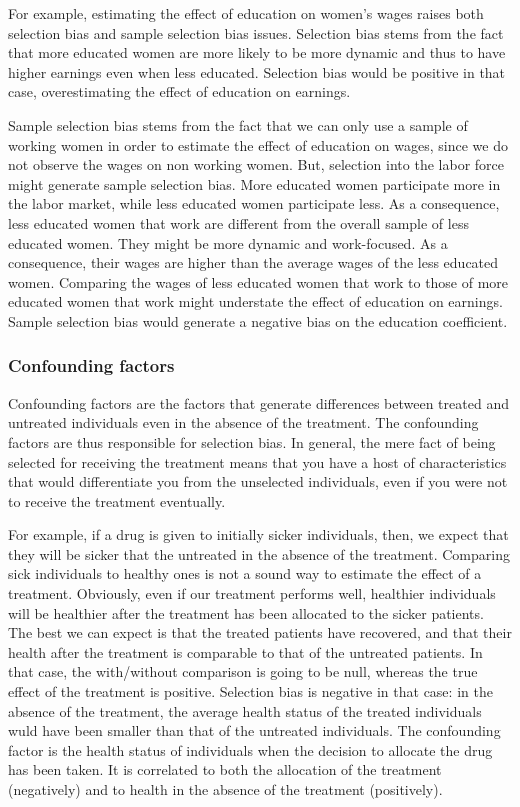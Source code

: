 \documentclass[]{book}
\theoremstyle{definition}
\theoremstyle{definition}
\theoremstyle{definition}
\theoremstyle{remark}
\begin{document}
For example, estimating the effect of education on women's wages raises
both selection bias and sample selection bias issues. Selection bias
stems from the fact that more educated women are more likely to be more
dynamic and thus to have higher earnings even when less educated.
Selection bias would be positive in that case, overestimating the effect
of education on earnings.

Sample selection bias stems from the fact that we can only use a sample
of working women in order to estimate the effect of education on wages,
since we do not observe the wages on non working women. But, selection
into the labor force might generate sample selection bias. More educated
women participate more in the labor market, while less educated women
participate less. As a consequence, less educated women that work are
different from the overall sample of less educated women. They might be
more dynamic and work-focused. As a consequence, their wages are higher
than the average wages of the less educated women. Comparing the wages
of less educated women that work to those of more educated women that
work might understate the effect of education on earnings. Sample
selection bias would generate a negative bias on the education
coefficient.

\subsubsection{Confounding factors}\label{confounding-factors}

Confounding factors are the factors that generate differences between
treated and untreated individuals even in the absence of the treatment.
The confounding factors are thus responsible for selection bias. In
general, the mere fact of being selected for receiving the treatment
means that you have a host of characteristics that would differentiate
you from the unselected individuals, even if you were not to receive the
treatment eventually.

For example, if a drug is given to initially sicker individuals, then,
we expect that they will be sicker that the untreated in the absence of
the treatment. Comparing sick individuals to healthy ones is not a sound
way to estimate the effect of a treatment. Obviously, even if our
treatment performs well, healthier individuals will be healthier after
the treatment has been allocated to the sicker patients. The best we can
expect is that the treated patients have recovered, and that their
health after the treatment is comparable to that of the untreated
patients. In that case, the with/without comparison is going to be null,
whereas the true effect of the treatment is positive. Selection bias is
negative in that case: in the absence of the treatment, the average
health status of the treated individuals wuld have been smaller than
that of the untreated individuals. The confounding factor is the health
status of individuals when the decision to allocate the drug has been
taken. It is correlated to both the allocation of the treatment
(negatively) and to health in the absence of the treatment (positively).
\end{document}
